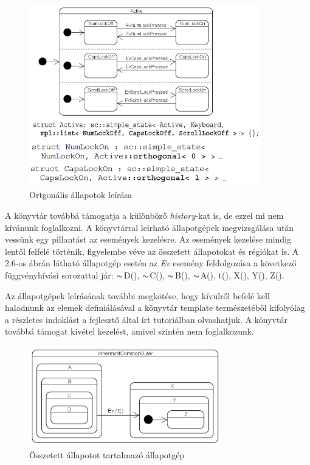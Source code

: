 \documentclass[a4paper,12pt]{report}
\begin{document}
\begin{figure}[hbtp]
\centering
\includegraphics[width=0.9\textwidth]{ortocode.png}
\caption{Ortgonális állapotok leírása}
\label{fig:ort}
\end{figure}

A könyvtár továbbá támogatja a különböző {\it history}-kat is, de ezzel mi nem kívánunk foglalkozni.
A könyvtárral leírható állapotgépek megvizsgálása után vessünk egy pillantást az események kezelésre. Az események kezelése mindig lentől felfelé történik, figyelembe véve az összetett állapotokat és régiókat is. A 2.6-os ábrán látható állapotgép esetén az {\it Ev} esemény feldolgozása a következő függvényhívási sorozattal jár: \begin{math}\thicksim\end{math}D(), \begin{math}\thicksim\end{math}C(), \begin{math}\thicksim\end{math}B(), \begin{math}\thicksim\end{math}A(), t(), X(), Y(), Z().

Az állapotgépek leírásának további megkötése, hogy kívülről befelé kell haladnunk az elemek definiálásával a könyvtár template természetéből kifolyólag a részletes indoklást a fejlesztő által írt tutoriálban olvashatjuk. A könyvtár továbbá támogat kivétel kezelést, amivel szintén nem foglalkozunk.

\begin{figure}[hbtp]
\centering
\includegraphics[width=0.75\textwidth]{hier.png}
\caption{Összetett állapotot tartalmazó állapotgép}
\label{fig:hir}
\end{figure}
\end{document}
